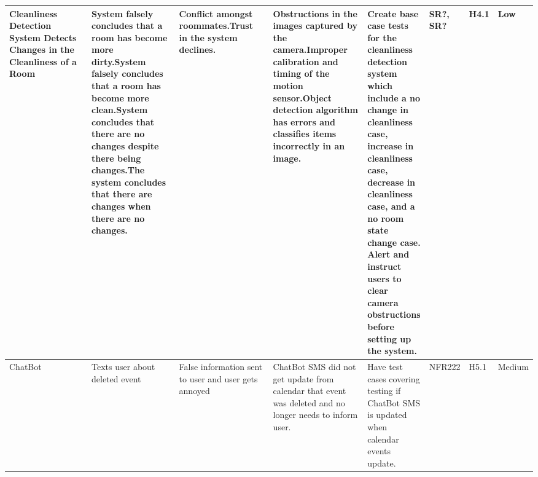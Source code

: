 \documentclass{article}
\begin{document}
\begin{table}[H]
\begin{adjustbox}{width=\textwidth}
\begin{tabular}{|p{0.25\linewidth} | p{0.25\linewidth} | p{0.22\linewidth}|  p{0.22\linewidth}|  p{0.30\linewidth}|  p{0.085\linewidth}|  p{0.05\linewidth}|p{0.12\linewidth}| }
         \hline
         Cleanliness Detection System Detects Changes in the Cleanliness of a Room & System falsely concludes that a room has become more dirty.\newline\newline System falsely concludes that a room has become more clean.\newline\newline System concludes that there are no changes despite there being changes.\newline\newline The system concludes that there are changes when there are no changes. & Conflict amongst roommates.\newline\newline Trust in the system declines. & Obstructions in the images captured by the camera.\newline\newline Improper calibration and timing of the motion sensor.\newline\newline Object detection algorithm has errors and classifies items incorrectly in an image.& Create base case tests for the cleanliness detection system which include a no change in cleanliness case, increase in cleanliness case, decrease in cleanliness case, and a no room state change case. \newline\newline Alert and instruct users to clear camera obstructions before setting up the system. & SR?, SR? & H4.1 & Low\\
         \hline
         ChatBot & Texts user about deleted event\newline & False information sent to user and user gets annoyed& ChatBot SMS did not get update from calendar that event was deleted and no longer needs to inform user.& Have test cases covering testing if ChatBot SMS is updated when calendar events update.& NFR222 & H5.1 & Medium\\
         \hline

\end{tabular}
\end{adjustbox}
\end{table}
\end{document}
